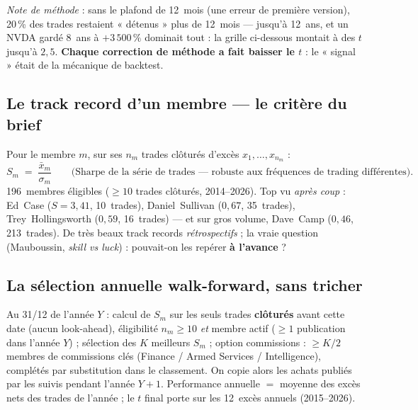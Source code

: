 \documentclass[11pt,a4paper]{article}
\begin{document}
\emph{Note de méthode} : sans le plafond de 12~mois (une erreur de première version), 20\,\% des trades
restaient « détenus » plus de 12~mois --- jusqu'à 12~ans, et un NVDA gardé 8~ans à $+3\,500\,\%$ dominait
tout : la grille ci-dessous montait à des $t$ jusqu'à $2{,}5$. \textbf{Chaque correction de méthode a
fait baisser le $t$} : le « signal » était de la mécanique de backtest.

\subsection{Le track record d'un membre --- le critère du brief}
Pour le membre $m$, sur ses $n_m$ trades clôturés d'excès $x_1,\dots,x_{n_m}$ :
\begin{equation}
S_m \;=\; \frac{\bar x_m}{\sigma_m}
\qquad\text{(Sharpe de la série de trades --- robuste aux fréquences de trading différentes).}
\end{equation}
196~membres éligibles ($\geq10$ trades clôturés, 2014--2026). Top vu \emph{après coup} : Ed~Case
($S=3{,}41$, 10~trades), Daniel~Sullivan ($0{,}67$, 35~trades), Trey~Hollingsworth ($0{,}59$, 16~trades)
--- et sur gros volume, Dave~Camp ($0{,}46$, 213~trades). De très beaux track records
\emph{rétrospectifs} ; la vraie question (Mauboussin, \emph{skill vs luck}) : pouvait-on les repérer
\textbf{à l'avance} ?

\subsection{La sélection annuelle walk-forward, sans tricher}
Au 31/12 de l'année $Y$ : calcul de $S_m$ sur les seuls trades \textbf{clôturés} avant cette date (aucun
look-ahead), éligibilité $n_m\geq10$ \emph{et} membre actif ($\geq1$ publication dans l'année $Y$) ;
sélection des $K$ meilleurs $S_m$ ; option commissions : $\geq K/2$ membres de commissions clés (Finance /
Armed Services / Intelligence), complétés par substitution dans le classement. On copie alors les achats
publiés par les suivis pendant l'année $Y{+}1$. Performance annuelle $=$ moyenne des excès nets des trades
de l'année ; le $t$ final porte sur les 12~excès annuels (2015--2026).
\end{document}
